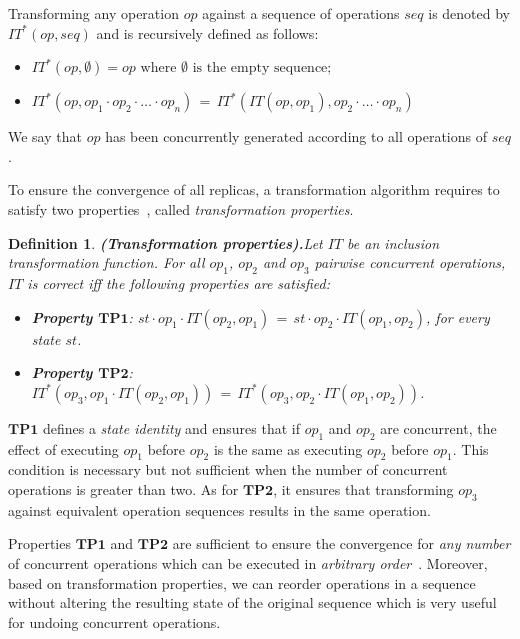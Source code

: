 \documentclass[submission,copyright,creativecommons]{eptcs}
\newtheorem{definition}{Definition}
\begin{document}
Transforming  any operation  $op$ against a sequence of operations  $seq$ is  denoted by
$IT^*(op,seq)$ and is recursively defined as follows:\begin{itemize}\vspace{-1mm}
\item $IT^*(op,\emptyset)=op\mbox{ where } \emptyset \mbox{ is the empty sequence;}$\vspace{-2mm}
\item $IT^*(op,op_1\cdot op_2\cdot\ldots\cdot op_n)\, =\, IT^*(IT(op,op_1),op_2\cdot\ldots\cdot op_n)$
\end{itemize}\vspace{-1mm}
We say that $op$ has been concurrently generated according to all
operations of $seq$.




To ensure the convergence of all replicas, a transformation algorithm requires to   satisfy   two
properties~\cite{Ressel.ea:96,Sun02}, called \emph{transformation properties}.

\begin{definition}\textbf{\emph{(Transformation properties).}}\label{Def:TP1TP2}
Let $IT$ be an inclusion transformation function. For all   $op_1$, $op_2$ and $op_3$
pairwise concurrent operations, $IT$ is \emph{correct} iff the following properties are
satisfied: 
\begin{itemize}
\item \textbf{Property $\mathbf{TP1}$}: $st\cdot op_1\cdot IT(op_2,op_1)\,=\,
      st\cdot op_2\cdot IT(op_1,op_2)$, for every state $st$.
\item \textbf{Property $\mathbf{TP2}$}:
        $IT^*(op_3,op_1\cdot IT(op_2,op_1))\,=\,IT^*(op_3,op_2\cdot IT(op_1,op_2))$.

\end{itemize}
\end{definition}

$\mathbf{TP1}$ defines a  \emph{state identity} and ensures that  if $op_1$ and
$op_2$ are concurrent, the effect of executing $op_1$ before $op_2$ is
the  same  as  executing  $op_2$  before  $op_1$.  This  condition  is
necessary but not sufficient  when the number of concurrent operations
is greater than two.  As  for $\mathbf{TP2}$, it ensures that transforming $op_3$
against equivalent  operation sequences  results in  the same operation.


Properties $\mathbf{TP1}$  and $\mathbf{TP2}$ are  sufficient to ensure  the convergence
for \textit{any number} of concurrent operations which can be
executed in \textit{arbitrary order}~\cite{Ressel.ea:96,Lus03}. Moreover, based on transformation properties, we can reorder operations in a sequence without altering
the resulting state of the original sequence which is very useful for undoing concurrent operations.
\end{document}
